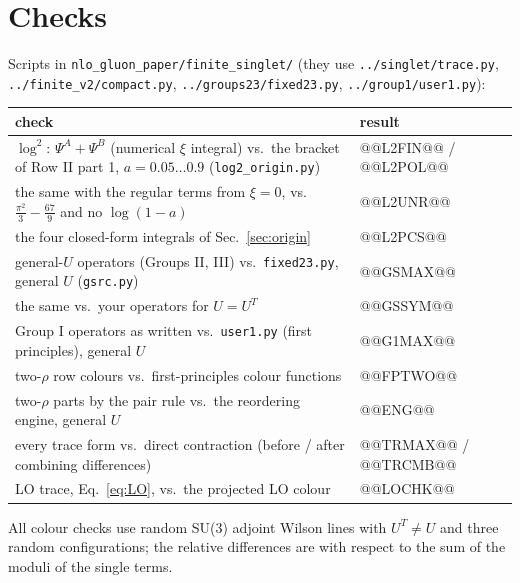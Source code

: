 \documentclass[10pt]{article}
\numberwithin{equation}{section}
\begin{document}
\section{Checks}\label{sec:checks}
Scripts in \texttt{nlo\_gluon\_paper/finite\_singlet/} (they use \texttt{../singlet/trace.py}, \texttt{../finite\_v2/compact.py}, \texttt{../groups23/fixed23.py}, \texttt{../group1/user1.py}):
\begin{table}[H]\centering\small
\begin{tabular}{@{}p{}p{}@{}}\toprule
check & result\\\midrule
$\log^2$: $\Psi^A+\Psi^B$ (numerical $\xi$ integral) vs.\ the bracket of Row II part 1, $a=0.05\dots0.9$ (\texttt{log2\_origin.py}) & @@L2FIN@@ / @@L2POL@@\\
the same with the regular terms from $\xi=0$, vs.\ $\frac{\pi^2}{3}-\frac{67}{9}$ and no $\log(1-a)$ & @@L2UNR@@\\
the four closed-form integrals of Sec.~\ref{sec:origin} & @@L2PCS@@\\
general-$U$ operators (Groups II, III) vs.\ \texttt{fixed23.py}, general $U$ (\texttt{gsrc.py}) & @@GSMAX@@\\
the same vs.\ your operators for $U=U^T$ & @@GSSYM@@\\
Group I operators as written vs.\ \texttt{user1.py} (first principles), general $U$ & @@G1MAX@@\\
two-$\rho$ row colours vs.\ first-principles colour functions & @@FPTWO@@\\
two-$\rho$ parts by the pair rule vs.\ the reordering engine, general $U$ & @@ENG@@\\
every trace form vs.\ direct contraction (before / after combining differences) & @@TRMAX@@ / @@TRCMB@@\\
LO trace, Eq.~\eqref{eq:LO}, vs.\ the projected LO colour & @@LOCHK@@\\\bottomrule
\end{tabular}
\end{table}
All colour checks use random SU(3) adjoint Wilson lines with $U^T\ne U$ and three random configurations; the relative differences are with respect to the sum of the moduli of the single terms.
\end{document}

